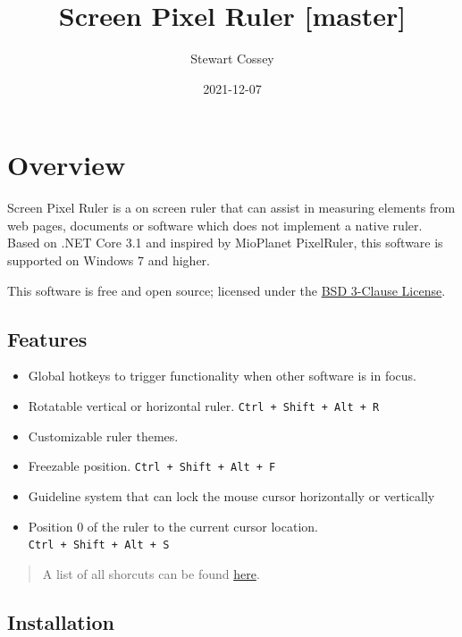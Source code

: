 \documentclass[
]{book}
\title{Screen Pixel Ruler {[}master{]}}
\author{Stewart Cossey}
\date{2021-12-07}
\providecommand{\tightlist}{%
  \setlength{\itemsep}{0pt}\setlength{\parskip}{0pt}}
\begin{document}
\maketitle

{
\setcounter{tocdepth}{1}
\tableofcontents
}
\hypertarget{overview}{%
\chapter{Overview}\label{overview}}

Screen Pixel Ruler is a on screen ruler that can assist in measuring elements from web pages, documents or software which does not implement a native ruler.
Based on .NET Core 3.1 and inspired by MioPlanet PixelRuler, this software is supported on Windows 7 and higher.

This software is free and open source; licensed under the \href{https://opensource.org/licenses/BSD-3-Clause}{BSD 3-Clause License}.

\hypertarget{features}{%
\section{Features}\label{features}}

\begin{itemize}
\tightlist
\item
  Global hotkeys to trigger functionality when other software is in focus.
\item
  Rotatable vertical or horizontal ruler. \texttt{Ctrl\ +\ Shift\ +\ Alt\ +\ R}
\item
  Customizable ruler themes.
\item
  Freezable position. \texttt{Ctrl\ +\ Shift\ +\ Alt\ +\ F}
\item
  Guideline system that can lock the mouse cursor horizontally or vertically
\item
  Position 0 of the ruler to the current cursor location. \texttt{Ctrl\ +\ Shift\ +\ Alt\ +\ S}
\end{itemize}

\begin{quote}
A list of all shorcuts can be found \protect\hyperlink{keyboard}{here}.
\end{quote}

\hypertarget{installation}{%
\section{Installation}\label{installation}}
\end{document}
